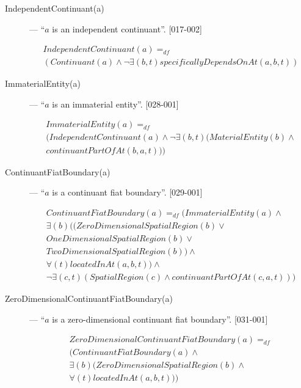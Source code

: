 \documentclass{article}
\newcommand{\DF}{\ensuremath{=_{df}}}
\begin{document}
\begin{description}

\item[IndependentContinuant(a)] --- ``$a$ is an independent continuant''.  [017-002]

\begin{equation}
\begin{split}
IndependentContinuant(a) \DF \\
(Continuant(a) \wedge {\neg}{\exists}(b, t)specificallyDependsOnAt(a, b, t))
\end{split}
\end{equation}

\item[ImmaterialEntity(a)] --- ``$a$ is an immaterial entity''. [028-001]

\begin{equation}
\begin{split}
ImmaterialEntity(a) \DF \\
(IndependentContinuant(a) \wedge {\neg}{\exists}(b, t)(MaterialEntity(b) \wedge \\
continuantPartOfAt(b, a, t)))
\end{split}
\end{equation}

\item[ContinuantFiatBoundary(a)] --- ``$a$ is a continuant fiat boundary''. [029-001]

\begin{equation}
\begin{split}
ContinuantFiatBoundary(a) \DF (ImmaterialEntity(a) \wedge \\
{\exists}(b)((ZeroDimensionalSpatialRegion(b) \vee \\
OneDimensionalSpatialRegion(b) \vee \\
TwoDimensionalSpatialRegion(b)) \wedge \\
{\forall}(t)locatedInAt(a, b, t)) \wedge \\
{\neg}{\exists}(c, t)(SpatialRegion(c) \wedge continuantPartOfAt(c, a, t)))
\end{split}
\end{equation}

\item[ZeroDimensionalContinuantFiatBoundary(a)] --- ``$a$ is a zero-dimensional continuant fiat boundary''. [031-001]

\begin{equation}
\begin{split}
ZeroDimensionalContinuantFiatBoundary(a) \DF \\
(ContinuantFiatBoundary(a) \wedge \\
{\exists}(b)(ZeroDimensionalSpatialRegion(b) \wedge \\
{\forall}(t)locatedInAt(a, b, t)))
\end{split}
\end{equation}


\end{description}
\end{document}

